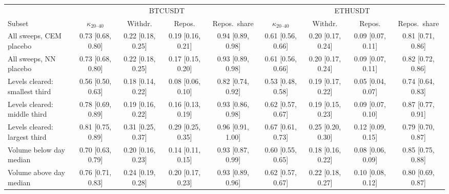 \begin{tabular}{lcccccccc}
\toprule
 & \multicolumn{4}{c}{BTCUSDT} & \multicolumn{4}{c}{ETHUSDT} \\
\cmidrule(lr){2-5}\cmidrule(lr){6-9}
Subset & $\kappa_{20\text{--}40}$ & Withdr. & Repos. & Repos.\ share & $\kappa_{20\text{--}40}$ & Withdr. & Repos. & Repos.\ share \\
\midrule
All sweeps, CEM placebo & 0.73 {\scriptsize[0.68, 0.80]} & 0.22 {\scriptsize[0.18, 0.25]} & 0.19 {\scriptsize[0.16, 0.21]} & 0.94 {\scriptsize[0.89, 0.98]} & 0.61 {\scriptsize[0.56, 0.66]} & 0.20 {\scriptsize[0.17, 0.24]} & 0.09 {\scriptsize[0.07, 0.11]} & 0.81 {\scriptsize[0.71, 0.86]} \\
All sweeps, NN placebo & 0.73 {\scriptsize[0.68, 0.80]} & 0.22 {\scriptsize[0.18, 0.25]} & 0.17 {\scriptsize[0.15, 0.20]} & 0.93 {\scriptsize[0.89, 0.98]} & 0.61 {\scriptsize[0.56, 0.66]} & 0.20 {\scriptsize[0.17, 0.24]} & 0.09 {\scriptsize[0.07, 0.11]} & 0.82 {\scriptsize[0.72, 0.86]} \\
\addlinespace
Levels cleared: smallest third & 0.56 {\scriptsize[0.50, 0.63]} & 0.18 {\scriptsize[0.14, 0.22]} & 0.08 {\scriptsize[0.06, 0.10]} & 0.82 {\scriptsize[0.74, 0.92]} & 0.53 {\scriptsize[0.48, 0.58]} & 0.19 {\scriptsize[0.17, 0.22]} & 0.05 {\scriptsize[0.04, 0.07]} & 0.74 {\scriptsize[0.64, 0.83]} \\
Levels cleared: middle third & 0.78 {\scriptsize[0.69, 0.89]} & 0.19 {\scriptsize[0.16, 0.22]} & 0.16 {\scriptsize[0.13, 0.19]} & 0.93 {\scriptsize[0.86, 0.98]} & 0.62 {\scriptsize[0.57, 0.67]} & 0.19 {\scriptsize[0.15, 0.23]} & 0.09 {\scriptsize[0.07, 0.10]} & 0.87 {\scriptsize[0.77, 0.91]} \\
Levels cleared: largest third & 0.81 {\scriptsize[0.75, 0.89]} & 0.31 {\scriptsize[0.25, 0.37]} & 0.29 {\scriptsize[0.25, 0.35]} & 0.96 {\scriptsize[0.91, 1.00]} & 0.67 {\scriptsize[0.61, 0.73]} & 0.25 {\scriptsize[0.20, 0.30]} & 0.12 {\scriptsize[0.09, 0.15]} & 0.79 {\scriptsize[0.70, 0.87]} \\
\addlinespace
Volume below day median & 0.70 {\scriptsize[0.63, 0.79]} & 0.20 {\scriptsize[0.16, 0.23]} & 0.14 {\scriptsize[0.11, 0.15]} & 0.93 {\scriptsize[0.87, 0.99]} & 0.60 {\scriptsize[0.55, 0.65]} & 0.18 {\scriptsize[0.16, 0.22]} & 0.08 {\scriptsize[0.06, 0.09]} & 0.85 {\scriptsize[0.75, 0.88]} \\
Volume above day median & 0.76 {\scriptsize[0.71, 0.83]} & 0.24 {\scriptsize[0.19, 0.28]} & 0.20 {\scriptsize[0.17, 0.23]} & 0.93 {\scriptsize[0.89, 0.96]} & 0.62 {\scriptsize[0.57, 0.67]} & 0.22 {\scriptsize[0.18, 0.27]} & 0.10 {\scriptsize[0.08, 0.12]} & 0.80 {\scriptsize[0.69, 0.87]} \\

\end{tabular}
